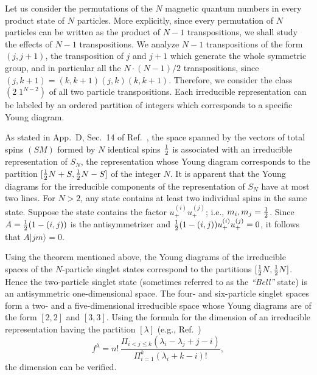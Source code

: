 \documentclass[rmp,amsfonts,showpacs,showkeys,preprint]{revtex4}
\begin{document}
Let us consider the permutations of the $N$ magnetic quantum numbers
in every product state of  $N$ particles.
More explicitly, since every
permutation of $N$ particles can be written as the product of
$N-1$ transpositions, we shall study the effects of $N-1$ transpositions.
We analyze $N-1$ transpositions of the
form $(j,j+1)$, the transposition of $j$ and $j+1$ which generate
the whole symmetric group,
and in particular all the $N\cdot (N-1)/2$
transpositions, since $(j,k+1)=(k,k+1)(j,k)(k,k+1)$.
Therefore, we consider the class $(2\;1^{N-2})$ of all two particle transpositions. Each irreducible
representation can be labeled by an ordered partition of integers
which corresponds to a specific Young diagram.


As stated in App.~D, Sec.~14 of Ref.~\cite{messiah-62}, the
space spanned by the vectors of total spins $(SM)$ formed by $N$
identical spins ${1\over 2}$ is associated with an irreducible
representation of $S_N$, the representation whose Young diagram
corresponds to the partition $[{1\over 2}N+S,{1\over 2}N-S]$ of
the integer $N$.  It is apparent that the Young diagrams for the
irreducible components of the representation of $S_N$ have at most
two lines. For $N>2$, any state contains at least two individual
spins in the same state.
Suppose the state contains the factor
$u_+^{(i)}u_+^{(j)}$; i.e., $m_i, m_j ={1\over 2}$.
Since
$A={1\over 2}(1-(i,j))$ is the antisymmetrizer and
${1\over 2}(1-(i,j))u_+^{(i)}u_+^{(j)}=0$,
it follows that $A|jm\rangle=0$.


Using the theorem mentioned above, the Young diagrams of the
irreducible spaces of the $N$-particle singlet states correspond to
the partitions $[{1\over 2}N,{1\over 2}N]$. Hence the two-particle
singlet state (sometimes referred to as the {\em ``Bell''} state)
is an antisymmetric one-dimensional space. The four-
and six-particle singlet spaces form a two- and a five-dimensional
irreducible space whose Young diagrams are of the form $[2,2]$ and
$[3,3]$.
Using the formula for the dimension of an irreducible
representation having the partition $[\lambda]$ (e.g., Ref.~\cite{wybourne})
\begin{equation}
f^\lambda = n!  \,
\frac{\Pi_{i<j\leq k}(\lambda_i-\lambda_j+j-i)}{\Pi^k_{i=1}(\lambda_i+k-i)!},\label{dim}
\end{equation}
the dimension can be verified.








\end{document}
